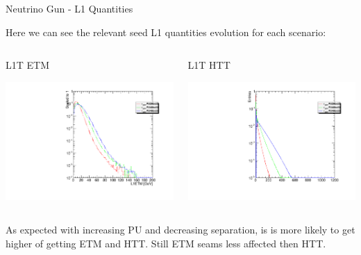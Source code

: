 \documentclass[8pt]{beamer}
\begin{document}
\begin{frame}{Neutrino Gun - L1 Quantities}

Here we can see the relevant seed L1 quantities evolution for each scenario:

\begin{columns}

\begin{block}{L1T ETM}
 
\centering
\includegraphics[width=\linewidth]{fig/L1ETM_NG.pdf}
 
\end{block}

\begin{block}{L1T HTT}
 
\centering
\includegraphics[width=\linewidth]{fig/L1HTT_NG.pdf}
 
\end{block}

\end{columns}

As expected with increasing PU and decreasing separation, is is more likely to get higher of getting ETM and HTT. Still ETM seams less affected then HTT. 

\end{frame}
\end{document}
